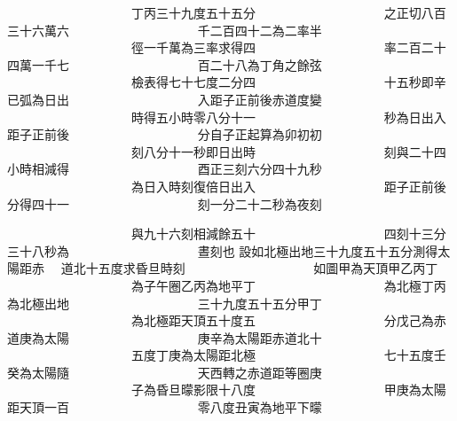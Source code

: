 \begin{正文}
　　　　　　　　　　丁丙三十九度五十五分
　　　　　　　　　　之正切八百三十六萬六
　　　　　　　　　　千二百四十二為二率半
　　　　　　　　　　徑一千萬為三率求得四
　　　　　　　　　　率二百二十四萬一千七
　　　　　　　　　　百二十八為丁角之餘弦
　　　　　　　　　　檢表得七十七度二分四
　　　　　　　　　　十五秒即辛已弧為日出
　　　　　　　　　　入距子正前後赤道度變
　　　　　　　　　　時得五小時零八分十一
　　　　　　　　　　秒為日出入距子正前後
　　　　　　　　　　分自子正起算為卯初初
　　　　　　　　　　刻八分十一秒即日出時
　　　　　　　　　　刻與二十四小時相減得
　　　　　　　　　　酉正三刻六分四十九秒
　　　　　　　　　　為日入時刻復倍日出入
　　　　　　　　　　距子正前後分得四十一
　　　　　　　　　　刻一分二十二秒為夜刻
\par
\end{正文}\clearpage
{}
\begin{正文}
　　　　　　　　　　與九十六刻相減餘五十
　　　　　　　　　　四刻十三分三十八秒為
　　　　　　　　　　晝刻也
設如北極出地三十九度五十五分測得太陽距赤
　道北十五度求昏旦時刻
　　　　　　　　　　如圖甲為天頂甲乙丙丁
　　　　　　　　　　為子午圈乙丙為地平丁
　　　　　　　　　　為北極丁丙為北極出地
　　　　　　　　　　三十九度五十五分甲丁
　　　　　　　　　　為北極距天頂五十度五
　　　　　　　　　　分戊己為赤道庚為太陽
　　　　　　　　　　庚辛為太陽距赤道北十
　　　　　　　　　　五度丁庚為太陽距北極
　　　　　　　　　　七十五度壬癸為太陽隨
　　　　　　　　　　天西轉之赤道距等圈庚
　　　　　　　　　　子為昏旦曚影限十八度
　　　　　　　　　　甲庚為太陽距天頂一百
　　　　　　　　　　零八度丑寅為地平下曚
\par
\end{正文}\clearpage
{}
